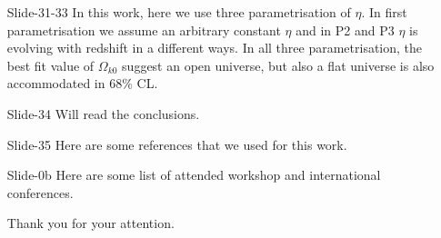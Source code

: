 \documentclass[12pt]{report}
\begin{document}
\begin{itemize}
\item[\ding{74} {\footnotesize Slide-31-33}]
In this work,  here we use three parametrisation of $\eta$. In first parametrisation we assume an arbitrary constant $\eta$ and in P2 and P3 $\eta$ is evolving with redshift in a different ways. In all three parametrisation,  the best fit value of $\Omega_{k0}$ suggest an open universe, but also a flat universe is also accommodated  in $68\%$ CL.

\item[\ding{74} Slide-34] 
Will read the conclusions.

\item[\ding{74} Slide-35] 
Here are some references that we used for this work.

 \item[\ding{74} {{\normalsize Slide-0b}}]
Here are some list of attended workshop and international conferences.
\begin{center}
Thank you for your attention.
\end{center}
\end{itemize}
\end{document}
